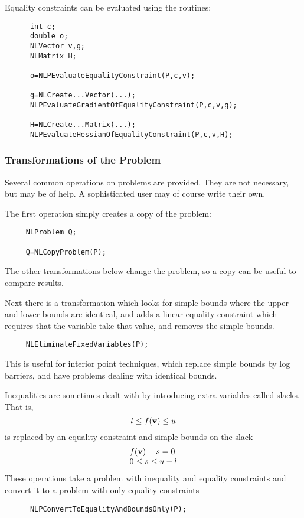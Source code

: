 \documentclass[12pt]{article}
\begin{document}
     Equality constraints can be evaluated using the routines:
     \begin{verbatim}
      int c;
      double o;
      NLVector v,g;
      NLMatrix H;

      o=NLPEvaluateEqualityConstraint(P,c,v);

      g=NLCreate...Vector(...);
      NLPEvaluateGradientOfEqualityConstraint(P,c,v,g);

      H=NLCreate...Matrix(...);
      NLPEvaluateHessianOfEqualityConstraint(P,c,v,H);
     \end{verbatim}

   \subsubsection{Transformations of the Problem}

    Several common operations on problems are provided. They are not necessary, but may be of help. A sophisticated 
    user may of course write their own.

    The first operation simply creates a copy of the problem:
    \begin{verbatim}
     NLProblem Q;

     Q=NLCopyProblem(P);
    \end{verbatim}
    The other transformations below change the problem, so a copy can be useful to compare results.

    Next there is a transformation which looks for simple bounds where the upper and lower bounds are
    identical, and adds a linear equality constraint which requires that the variable take that value, 
    and removes the simple bounds.
    \begin{verbatim}
     NLEliminateFixedVariables(P);
    \end{verbatim}
    This is useful for interior point techniques, which replace simple bounds by log barriers, and have
    problems dealing with identical bounds.

    Inequalities are sometimes dealt with by introducing extra variables called slacks. That is,
    \begin{displaymath}
      l\leq f({\bf v})\leq u
    \end{displaymath}
    is replaced by an equality constraint and simple bounds on the slack --
    \begin{displaymath}
    \begin{array}{l}
      \displaystyle f({\bf v})-s =0 \\
      \displaystyle 0\leq s \leq u-l\\
    \end{array}
    \end{displaymath}
    These operations take a problem with inequality and equality constraints and convert it to a problem
    with only equality constraints --
    \begin{verbatim}
      NLPConvertToEqualityAndBoundsOnly(P);
    \end{verbatim}
\end{document}
